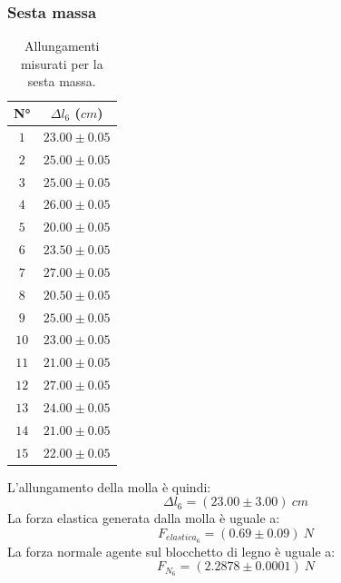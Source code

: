 \documentclass[11pt]{article}
\begin{document}
\subsubsection{Sesta massa}
\begin{table}[H]
\centering
\begin{tabular}{|c|c|}
\hline
\textbf{N°} & \textbf{$\Delta l_6$ ($cm$)}\\
\hline
$1$ & $23.00\pm 0.05$ \\
\hline
$2$ & $25.00\pm 0.05$ \\
\hline
$3$ & $25.00\pm 0.05$ \\
\hline
$4$ & $26.00\pm 0.05$ \\
\hline
$5$ & $20.00\pm 0.05$ \\
\hline
$6$ & $23.50\pm 0.05$ \\
\hline
$7$ & $27.00\pm 0.05$ \\
\hline
$8$ & $20.50\pm 0.05$ \\
\hline
$9$ & $25.00\pm 0.05$ \\
\hline
$10$ & $23.00\pm 0.05$ \\
\hline
$11$ & $21.00\pm 0.05$ \\
\hline
$12$ & $27.00\pm 0.05$ \\
\hline
$13$ & $24.00\pm 0.05$ \\
\hline
$14$ & $21.00\pm 0.05$ \\
\hline
$15$ & $22.00\pm 0.05$ \\
\hline
\end{tabular}
\caption{Allungamenti misurati per la sesta massa.}
\label{tab:}
\end{table}
L'allungamento della molla è quindi:
\begin{equation}
    \Delta l_6=(23.00\pm 3.00)\ cm
\end{equation}
La forza elastica generata dalla molla è uguale a:
\begin{equation}
    F_{elastica_6} = (0.69\pm 0.09)\ N
\end{equation}
La forza normale agente sul blocchetto di legno è uguale a:
\begin{equation}
    F_{N_6} = (2.2878\pm 0.0001)\ N
\end{equation}
\end{document}

